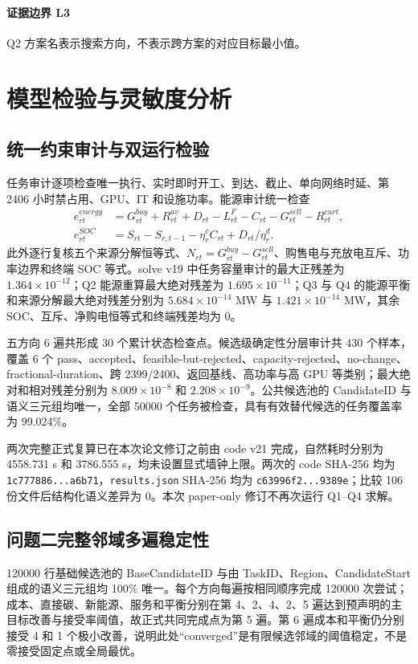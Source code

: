 \documentclass[withoutpreface,bwprint]{cumcmthesis}
\begin{document}
\paragraph{证据边界 L3}Q2 方案名表示搜索方向，不表示跨方案的对应目标最小值。
\section{模型检验与灵敏度分析}

\subsection{统一约束审计与双运行检验}
任务审计逐项检查唯一执行、实时即时开工、到达、截止、单向网络时延、第 2406 小时禁占用、GPU、IT 和设施功率。能源审计统一检查
\begin{align}
e^{energy}_{rt}&=G^{buy}_{rt}+R^{av}_{rt}+D_{rt}-L^F_{rt}-C_{rt}-G^{sell}_{rt}-R^{curt}_{rt},\\
e^{SOC}_{rt}&=S_{rt}-S_{r,t-1}-\eta_r^cC_{rt}+D_{rt}/\eta_r^d.
\end{align}
此外逐行复核五个来源分解恒等式、$N_{rt}=G^{buy}_{rt}-G^{sell}_{rt}$、购售电与充放电互斥、功率边界和终端 SOC 等式。solve v19 中任务容量审计的最大正残差为 $1.364\times10^{-12}$；Q2 能源重算最大绝对残差为 $1.695\times10^{-11}$；Q3 与 Q4 的能源平衡和来源分解最大绝对残差分别为 $5.684\times10^{-14}$ MW 与 $1.421\times10^{-14}$ MW，其余 SOC、互斥、净购电恒等式和终端残差均为 0。

五方向 6 遍共形成 30 个累计状态检查点。候选级确定性分层审计共 430 个样本，覆盖 6 个 pass、accepted、feasible-but-rejected、capacity-rejected、no-change、fractional-duration、跨 2399/2400、返回基线、高功率与高 GPU 等类别；最大绝对和相对残差分别为 $8.009\times10^{-8}$ 和 $2.208\times10^{-9}$。公共候选池的 CandidateID 与语义三元组均唯一，全部 50000 个任务被检查，具有有效替代候选的任务覆盖率为 99.024\%。

两次完整正式复算已在本次论文修订之前由 code v21 完成，自然耗时分别为 4558.731 s 和 3786.555 s，均未设置显式墙钟上限。两次的 code SHA-256 均为 \texttt{1c777886...a6b71}，\texttt{results.json} SHA-256 均为 \texttt{c63996f2...9389e}；比较 106 份文件后结构化语义差异为 0。本次 paper-only 修订不再次运行 Q1--Q4 求解。

\subsection{问题二完整邻域多遍稳定性}
120000 行基础候选池的 BaseCandidateID 与由 TaskID、Region、CandidateStart 组成的语义三元组均 100\% 唯一。每个方向每遍按相同顺序完成 120000 次尝试；成本、直接碳、新能源、服务和平衡分别在第 4、2、4、2、5 遍达到预声明的主目标改善与接受率阈值，故正式共同完成点为第 5 遍。第 6 遍成本和平衡仍分别接受 4 和 1 个极小改善，说明此处“converged”是有限候选邻域的阈值稳定，不是零接受固定点或全局最优。
\end{document}
